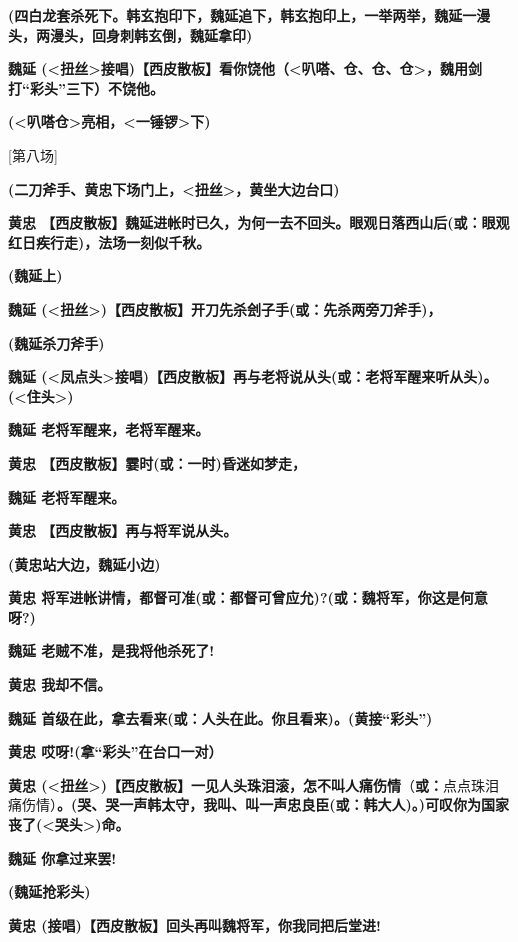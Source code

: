 \textbf{(四白龙套杀死下。韩玄抱印下，魏延追下，韩玄抱印上，一举两举，魏延一漫头，两漫头，回身刺韩玄倒，魏延拿印)}

\textbf{魏延
(\textless{}扭丝\textgreater{}接唱)【西皮散板】看你饶他（\textless{}叭嗒、仓、仓、仓\textgreater{}，魏用剑打``彩头''三下）不饶他。}

\textbf{(\textless{}叭嗒仓\textgreater{}亮相，\textless{}一锤锣\textgreater{}下)}

{[}第八场{]}

\textbf{(二刀斧手、黄忠下场门上，\textless{}扭丝\textgreater{}，黄坐大边台口)}

\textbf{黄忠
【西皮散板】魏延进帐时已久，为何一去不回头。眼观日落西山后(或：眼观红日疾行走)，法场一刻似千秋。}

\textbf{(魏延上)}

\textbf{魏延
(\textless{}扭丝\textgreater{})【西皮散板】开刀先杀刽子手(或：先杀两旁刀斧手)，}

\textbf{(魏延杀刀斧手)}

\textbf{魏延
(\textless{}凤点头\textgreater{}接唱)【西皮散板】再与老将说从头(或：老将军醒来听从头)。(\textless{}住头\textgreater{})}

\textbf{魏延 老将军醒来，老将军醒来。}

\textbf{黄忠 【西皮散板】霎时(或：一时)昏迷如梦走，}

\textbf{魏延 老将军醒来。}

\textbf{黄忠 【西皮散板】再与将军说从头。}

\textbf{(黄忠站大边，魏延小边)}

\textbf{黄忠
将军进帐讲情，都督可准(或：都督可曾应允)?(或：魏将军，你这是何意呀?)}

\textbf{魏延 老贼不准，是我将他杀死了!}

\textbf{黄忠 我却不信。}

\textbf{魏延 首级在此，拿去看来(或：人头在此。你且看来)。(黄接``彩头'')}

\textbf{黄忠 哎呀!(拿``彩头''在台口一对）}

\textbf{黄忠
(\textless{}扭丝\textgreater{})【西皮散板】一见人头珠泪滚，{怎不叫人痛伤情}}（\textbf{或：}点点珠泪痛伤情）\textbf{。(哭、哭一声韩太守，我叫、叫一声{忠良臣}(或：韩大人)。)可叹你为国家丧了(\textless{}哭头\textgreater{})命。}

\textbf{魏延 你拿过来罢!}

\textbf{(魏延抢彩头)}

\textbf{黄忠 (接唱)【西皮散板】回头再叫魏将军，你我同把后堂进!}

